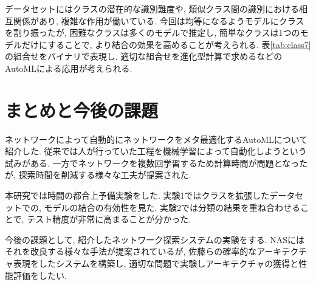 \documentclass[twocolumn]{jarticle}     %
\begin{document}
データセットにはクラスの潜在的な識別難度や, 類似クラス間の識別における相互関係があり, 複雑な作用が働いている.
今回は均等になるようモデルにクラスを割り振ったが,
困難なクラスは多くのモデルで推定し, 簡単なクラスは1つのモデルだけにすることで, より結合の効果を高めることが考えられる.
表\ref{tab:class7}の組合せをバイナリで表現し, 適切な組合せを進化型計算で求めるなどのAutoMLによる応用が考えられる.

\section{まとめと今後の課題}

ネットワークによって自動的にネットワークをメタ最適化するAutoMLについて紹介した.
従来では人が行っていた工程を機械学習によって自動化しようという試みがある.
一方でネットワークを複数回学習するため計算時間が問題となったが, 探索時間を削減する様々な工夫が提案された.

本研究では時間の都合上予備実験をした.
実験1ではクラスを拡張したデータセットでの, モデルの結合の有効性を見た.
実験2では分類の結果を重ね合わせることで, テスト精度が非常に高まることが分かった.

今後の課題として,
紹介したネットワーク探索システムの実験をする.
NASにはそれを改良する様々な手法が提案されているが,
佐藤ら\cite{ANAS}の確率的なアーキテクチャ表現をしたシステムを構築し, 適切な問題で実験しアーキテクチャの獲得と性能評価をしたい.



\end{document}
